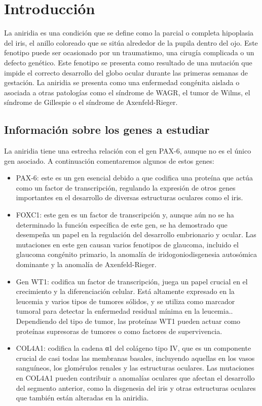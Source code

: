 \section{Introducción}


La aniridia es una condición que se define como la parcial o completa hipoplasia del iris, el anillo coloreado que se sitúa alrededor de la pupila dentro del ojo. Este fenotipo puede ser ocasionado por un traumatismo, una cirugía complicada o un defecto genético. 
Este fenotipo se presenta como resultado de una mutación que impide el correcto desarrollo del globo ocular durante las primeras semanas de gestación. La aniridia se presenta como una enfermedad congénita aislada o asociada a otras patologías como el síndrome de WAGR, el tumor de Wilms, el síndrome de Gillespie o el síndrome de Axenfeld-Rieger.

\subsection{Información sobre los genes a estudiar}

La aniridia tiene una estrecha relación con el gen PAX-6, aunque no es el único gen asociado. A continuación comentaremos algunos de estos genes: 

\begin{itemize}
	\item PAX-6: este es un gen esencial debido a que codifica una proteína que actúa como un factor de transcripción, regulando la expresión de otros genes importantes en el desarrollo de diversas estructuras oculares como el iris.
	\item FOXC1: este gen es un factor de transcripción y, aunque aún no se ha determinado la función específica de este gen, se ha demostrado que desempeña un papel en la regulación del desarrollo embrionario y ocular. Las mutaciones en este gen causan varios fenotipos de glaucoma, incluido el glaucoma congénito primario, la anomalía de iridogoniodisgenesia autosómica dominante y la anomalía de Axenfeld-Rieger.
	\item Gen WT1: codifica un factor de transcripción, juega un papel crucial en el crecimiento y la diferenciación celular. Está altamente expresado en la leucemia y varios tipos de tumores sólidos, y se utiliza como marcador tumoral para detectar la enfermedad residual mínima en la leucemia.\cite{10.1093/jjco/hyp194}. Dependiendo del tipo de tumor, las proteínas WT1 pueden actuar como proteínas supresoras de tumores o como factores de supervivencia.\cite{SCHARNHORST2001141}
	\item COL4A1: codifica la cadena α1 del colágeno tipo IV, que es un componente crucial de casi todas las membranas basales, incluyendo aquellas en los vasos sanguíneos, los glomérulos renales y las estructuras oculares.\cite{Vahedi2011} Las mutaciones en COL4A1 pueden contribuir a anomalías oculares que afectan el desarrollo del segmento anterior, como la disgenesia del iris y otras estructuras oculares que también están alteradas en la aniridia.\cite{Reis2011}	
	
\end{itemize}


